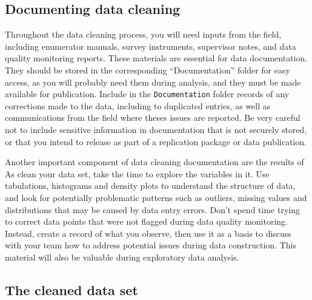 \subsection{Documenting data cleaning}

Throughout the data cleaning process, you will need inputs from the field, 
including enumerator manuals, survey instruments, 
supervisor notes, and data quality monitoring reports.
These materials are essential for data documentation.
They should be stored in the corresponding ``Documentation'' folder for easy access, 
as you will probably need them during analysis,
and they must be made available for publication.
Include in the \texttt{Documentation} folder records of any
corrections made to the data, including to duplicated entries,
as well as communications from the field where theses issues are reported.
Be very careful not to include sensitive information in documentation that is not securely stored, 
or that you intend to release as part of a replication package or data publication.

Another important component of data cleaning documentation are the results of 
As clean your data set, take the time to explore the variables in it.
Use tabulations, histograms and density plots to understand the structure of data,
and look for potentially problematic patterns such as outliers,
missing values and distributions that may be caused by data entry errors.
Don't spend time trying to correct data points that were not flagged during data quality monitoring.
Instead, create a record of what you observe,
then use it as a basis to discuss with your team how to address potential issues during data construction.
This material will also be valuable during exploratory data analysis.

\subsection{The cleaned data set}

